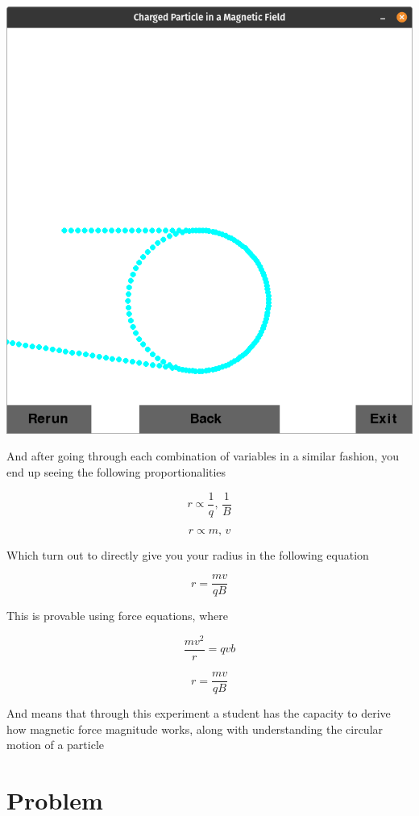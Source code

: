 \documentclass[11pt]{article}
\begin{document}
   			\includegraphics[scale=0.3]{6}
   			
   			And after going through each combination of variables in a similar fashion, you end up seeing the following proportionalities
   			
   			\[r \propto \frac{1}{q},\,\frac{1}{B}\]
   			
   			\[r \propto m,\,v\]
   			
   			Which turn out to directly give you your radius in the following equation
   			
   			\[r = \frac{mv}{qB}\]
   			
   			This is provable using force equations, where
   			
   			\[\frac{m v^2}{r} = q v b\]
   			
   			\[r = \frac{mv}{qB}\]
   			
   			And means that through this experiment a student has the capacity to derive how magnetic force magnitude works, along with understanding the circular motion of a particle
   			
   	    \section*{Problem}
   	    
\end{document}
